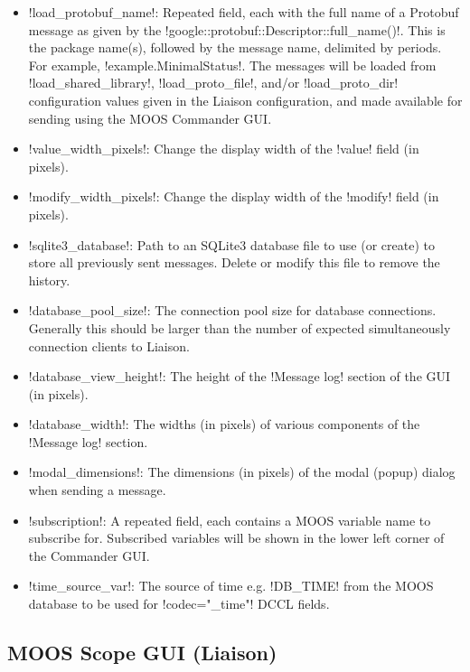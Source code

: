 \begin{itemize}
\item !load_protobuf_name!: Repeated field, each with the full name of a Protobuf message as given by the !google::protobuf::Descriptor::full_name()!. This is the package name(s), followed by the message name, delimited by periods. For example, !example.MinimalStatus!. The messages will be loaded from !load_shared_library!, !load_proto_file!, and/or !load_proto_dir! configuration values given in the Liaison configuration, and made available for sending using the MOOS Commander GUI.
\item !value_width_pixels!: Change the display width of the !value! field (in pixels).
\item !modify_width_pixels!:  Change the display width of the !modify! field (in pixels).
\item !sqlite3_database!: Path to an SQLite3 database file to use (or create) to store all previously sent messages. Delete or modify this file to remove the history.
\item !database_pool_size!: The connection pool size for database connections. Generally this should be larger than the number of expected simultaneously connection clients to Liaison.
\item !database_view_height!: The height of the !Message log! section of the GUI (in pixels).
\item !database_width!: The widths (in pixels) of various components of the !Message log! section.
\item !modal_dimensions!:  The dimensions (in pixels) of the modal (popup) dialog when sending a message. 
\item !subscription!: A repeated field, each contains a MOOS variable name to subscribe for. Subscribed variables will be shown in the lower left corner of the Commander GUI.
\item !time_source_var!: The source of time e.g. !DB_TIME! from the MOOS database to be used for !codec="_time"! DCCL fields.
\end{itemize}


\subsection{MOOS Scope GUI (Liaison)}

\resetbvlinenumber

